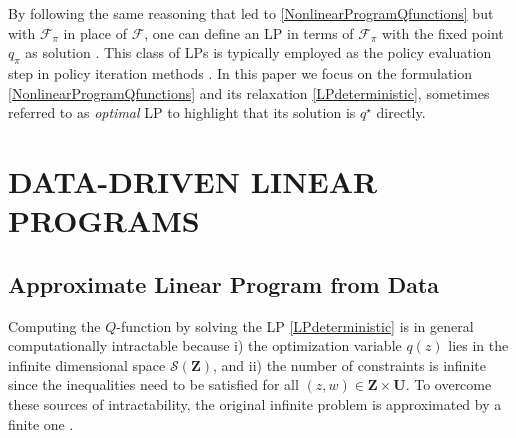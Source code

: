 \documentclass[journal,twoside,web]{ieeecolor}
\newcommand{\F}{\mathcal{F}}
\newcommand{\Sc}{\mathcal{S}}
\newcommand{\Xb}{\mathbf{X}}
\newcommand{\Ub}{\mathbf{U}}
\newcommand{\Zb}{\mathbf{Z}}
\begin{document}

By following the same reasoning that led to \eqref{NonlinearProgramQfunctions} but with $\F_\pi$ in place of $\F$, one can define an LP in terms of $\F_\pi$ with the fixed point $q_\pi$ as solution \cite{GoranADP}. This class of LPs is typically employed as the policy evaluation step in policy iteration methods \cite{GoranADP,LuciaBounded}. In this paper we focus on the formulation \eqref{NonlinearProgramQfunctions} and its relaxation \eqref{LPdeterministic}, sometimes referred to as \textit{optimal} LP to highlight that its solution is $q^\star$ directly.
\fi

\section{DATA-DRIVEN LINEAR PROGRAMS}

\subsection{Approximate Linear Program from Data}

Computing the $Q$-function by solving the LP \eqref{LPdeterministic} is in general computationally intractable because i) the optimization variable $q(z)$ lies in the infinite dimensional space $\Sc (\Zb)$, and ii) the number of constraints is infinite since the inequalities need to be satisfied for all $(z,w) \in \Zb \times \Ub$. To overcome these sources of intractability,  the original infinite problem is approximated by a finite one \cite{CogillDecentralizedADP, PaulADP, deFariasConstraintSampling}. 
\end{document}
